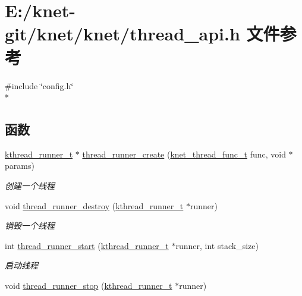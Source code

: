 \hypertarget{a00099}{}\section{E\+:/knet-\/git/knet/knet/thread\+\_\+api.h 文件参考}
\label{a00099}
{\ttfamily \#include \char`\"{}config.\+h\char`\"{}}\\*
\subsection*{函数}
\begin{DoxyCompactItemize}
\item 
\hyperlink{a00054_a4f78c259c9527c821f1a6f87495dd339_a4f78c259c9527c821f1a6f87495dd339}{kthread\+\_\+runner\+\_\+t} $\ast$ \hyperlink{a00117_gacc8838f250e5f685580a508e93d3f636_gacc8838f250e5f685580a508e93d3f636}{thread\+\_\+runner\+\_\+create} (\hyperlink{a00054_a8741dac4a9f8d97603eb3a30a3473b13_a8741dac4a9f8d97603eb3a30a3473b13}{knet\+\_\+thread\+\_\+func\+\_\+t} func, void $\ast$params)
\begin{DoxyCompactList}\small\item\em 创建一个线程 \end{DoxyCompactList}\item 
void \hyperlink{a00117_gaa9112d70f3e5a8dcf648ce531332f66a_gaa9112d70f3e5a8dcf648ce531332f66a}{thread\+\_\+runner\+\_\+destroy} (\hyperlink{a00054_a4f78c259c9527c821f1a6f87495dd339_a4f78c259c9527c821f1a6f87495dd339}{kthread\+\_\+runner\+\_\+t} $\ast$runner)
\begin{DoxyCompactList}\small\item\em 销毁一个线程 \end{DoxyCompactList}\item 
int \hyperlink{a00117_gae125061eb96b154766c0a414eb74065c_gae125061eb96b154766c0a414eb74065c}{thread\+\_\+runner\+\_\+start} (\hyperlink{a00054_a4f78c259c9527c821f1a6f87495dd339_a4f78c259c9527c821f1a6f87495dd339}{kthread\+\_\+runner\+\_\+t} $\ast$runner, int stack\+\_\+size)
\begin{DoxyCompactList}\small\item\em 启动线程 \end{DoxyCompactList}\item 
void \hyperlink{a00117_gac8644b2d2ca5580e0cac7378154ae2e0_gac8644b2d2ca5580e0cac7378154ae2e0}{thread\+\_\+runner\+\_\+stop} (\hyperlink{a00054_a4f78c259c9527c821f1a6f87495dd339_a4f78c259c9527c821f1a6f87495dd339}{kthread\+\_\+runner\+\_\+t} $\ast$runner)

\end{DoxyCompactItemize}
